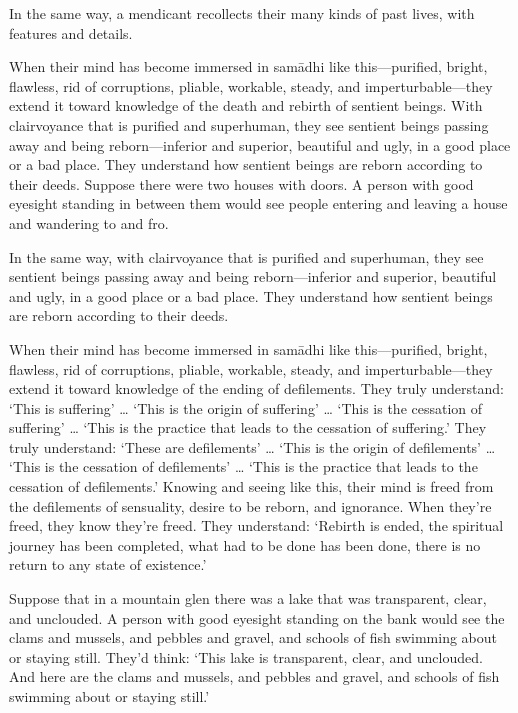\documentclass[12pt,openany]{book}%
\begin{document}
In the same way, a mendicant recollects their many kinds of past lives, with features and details. 

When their mind has become immersed in \textsanskrit{samādhi} like this—purified, bright, flawless, rid of corruptions, pliable, workable, steady, and imperturbable—they extend it toward knowledge of the death and rebirth of sentient beings. With clairvoyance that is purified and superhuman, they see sentient beings passing away and being reborn—inferior and superior, beautiful and ugly, in a good place or a bad place. They understand how sentient beings are reborn according to their deeds. Suppose there were two houses with doors. A person with good eyesight standing in between them would see people entering and leaving a house and wandering to and fro. 

In the same way, with clairvoyance that is purified and superhuman, they see sentient beings passing away and being reborn—inferior and superior, beautiful and ugly, in a good place or a bad place. They understand how sentient beings are reborn according to their deeds. 

When their mind has become immersed in \textsanskrit{samādhi} like this—purified, bright, flawless, rid of corruptions, pliable, workable, steady, and imperturbable—they extend it toward knowledge of the ending of defilements. They truly understand: ‘This is suffering’ … ‘This is the origin of suffering’ … ‘This is the cessation of suffering’ … ‘This is the practice that leads to the cessation of suffering.’ They truly understand: ‘These are defilements’ … ‘This is the origin of defilements’ … ‘This is the cessation of defilements’ … ‘This is the practice that leads to the cessation of defilements.’ Knowing and seeing like this, their mind is freed from the defilements of sensuality, desire to be reborn, and ignorance. When they’re freed, they know they’re freed. They understand: ‘Rebirth is ended, the spiritual journey has been completed, what had to be done has been done, there is no return to any state of existence.’ 

Suppose that in a mountain glen there was a lake that was transparent, clear, and unclouded. A person with good eyesight standing on the bank would see the clams and mussels, and pebbles and gravel, and schools of fish swimming about or staying still. They’d think: ‘This lake is transparent, clear, and unclouded. And here are the clams and mussels, and pebbles and gravel, and schools of fish swimming about or staying still.’ 
\end{document}
